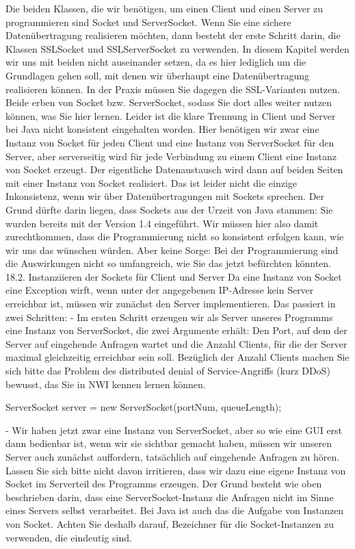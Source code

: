 Die beiden Klassen, die wir benötigen, um einen Client und einen Server zu programmieren sind Socket und ServerSocket. Wenn Sie eine sichere Datenübertragung realisieren möchten, dann besteht der erste Schritt darin, die Klassen SSLSocket und SSLServerSocket zu verwenden. In diesem Kapitel werden wir uns mit beiden nicht auseinander setzen, da es hier lediglich um die Grundlagen gehen soll, mit denen wir überhaupt eine Datenübertragung realisieren können. In der Praxis müssen Sie dagegen die SSL-Varianten nutzen. Beide erben von Socket bzw. ServerSocket, sodass Sie dort alles weiter nutzen können, was Sie hier lernen.
Leider ist die klare Trennung in Client und Server bei Java nicht konsistent eingehalten worden. Hier benötigen wir zwar eine Instanz von Socket für jeden Client und eine Instanz von ServerSocket für den Server, aber serverseitig wird für jede Verbindung zu einem Client eine Instanz von Socket erzeugt. Der eigentliche Datenaustausch wird dann auf beiden Seiten mit einer Instanz von Socket realisiert.
Das ist leider nicht die einzige Inkonsistenz, wenn wir über Datenübertragungen mit Sockets sprechen. Der Grund dürfte darin liegen, dass Sockets aus der Urzeit von Java stammen: Sie wurden bereits mit der Version 1.4 eingeführt. Wir müssen hier also damit zurechtkommen, dass die Programmierung nicht so konsistent erfolgen kann, wie wir uns das wünschen würden. Aber keine Sorge: Bei der Programmierung sind die Auswirkungen nicht so umfangreich, wie Sie das jetzt befürchten könnten.
18.2.	Instanziieren der Sockets für Client und Server
Da eine Instanz von Socket eine Exception wirft, wenn unter der angegebenen IP-Adresse kein Server erreichbar ist, müssen wir zunächst den Server implementieren. Das passiert in zwei Schritten: 
-	Im ersten Schritt erzeugen wir als Server unseres Programms eine Instanz von ServerSocket, die zwei Argumente erhält: Den Port, auf dem der Server auf eingehende Anfragen wartet und die Anzahl Clients, für die der Server maximal gleichzeitig erreichbar sein soll. Bezüglich der Anzahl Clients machen Sie sich bitte das Problem des distributed denial of Service-Angriffs (kurz DDoS) bewusst, das Sie in NWI kennen lernen können.

ServerSocket server = new ServerSocket(portNum, queueLength);

-	Wir haben jetzt zwar eine Instanz von ServerSocket, aber so wie eine GUI erst dann bedienbar ist, wenn wir sie sichtbar gemacht haben, müssen wir unseren Server auch zunächst auffordern, tatsächlich auf eingehende Anfragen zu hören. Lassen Sie sich bitte nicht davon irritieren, dass wir dazu eine eigene Instanz von Socket im Serverteil des Programms erzeugen. Der Grund besteht wie oben beschrieben darin, dass eine ServerSocket-Instanz die Anfragen nicht im Sinne eines Servers selbst verarbeitet. Bei Java ist auch das die Aufgabe von Instanzen von Socket. Achten Sie deshalb darauf, Bezeichner für die Socket-Instanzen zu verwenden, die eindeutig sind.

